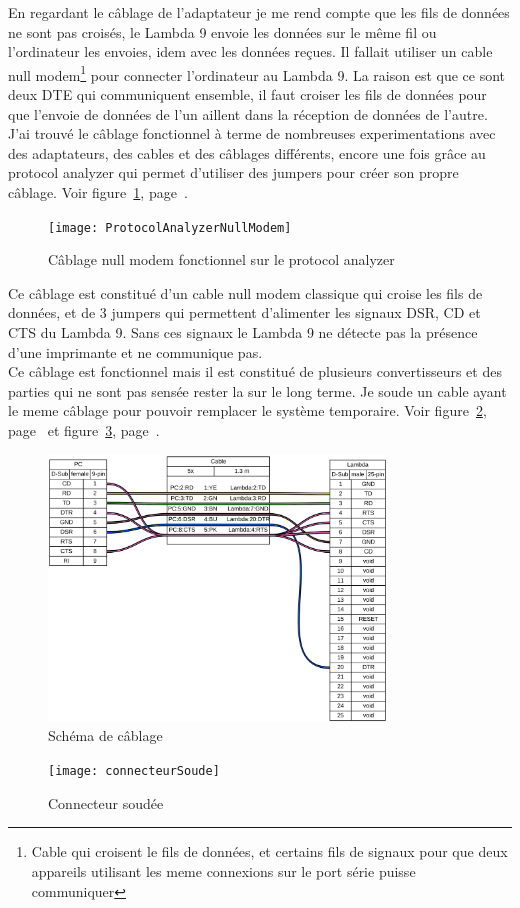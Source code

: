 \documentclass[12pt]{article}
\begin{document}
En regardant le câblage de l'adaptateur je me rend compte que les fils de données ne sont pas croisés, le Lambda 9 envoie les données sur le même fil ou l'ordinateur les envoies, idem avec les données reçues.
Il fallait utiliser un cable null modem\footnote{Cable qui croisent le fils de données, et certains fils de signaux pour que deux appareils utilisant les meme connexions sur le port série puisse communiquer} pour connecter l'ordinateur au Lambda 9.
La raison est que ce sont deux DTE qui communiquent ensemble, il faut croiser les fils de données pour que l'envoie de données de l'un aillent dans la réception de données de l'autre.\\
J'ai trouvé le câblage fonctionnel à terme de nombreuses experimentations avec des adaptateurs, des cables et des câblages différents, encore une fois grâce au protocol analyzer qui permet d'utiliser des jumpers pour créer son propre câblage.
Voir figure~\ref{fig:cablageProtocolAnalyzer}, page~\pageref{fig:cablageProtocolAnalyzer}.
\begin{figure}[h]
	\centering
	\texttt{[image: ProtocolAnalyzerNullModem]}
	\caption{Câblage null modem fonctionnel sur le protocol analyzer}
	\label{fig:cablageProtocolAnalyzer}
\end{figure}
Ce câblage est constitué d'un cable null modem classique qui croise les fils de données, et de 3 jumpers qui permettent d'alimenter les signaux DSR, CD et CTS du Lambda 9.
Sans ces signaux le Lambda 9 ne détecte pas la présence d'une imprimante et ne communique pas.\\
Ce câblage est fonctionnel mais il est constitué de plusieurs convertisseurs et des parties qui ne sont pas sensée rester la sur le long terme.
Je soude un cable ayant le meme câblage pour pouvoir remplacer le système temporaire.
Voir figure~\ref{fig:schemaCable}, page~\pageref{fig:schemaCable} et figure~\ref{fig:connecteurSoudee}, page~\pageref{fig:connecteurSoudee}.
\begin{figure}[htb]
	\centering
	\includegraphics[width=0.8\textwidth]{cableLambda}
	\caption{Schéma de câblage}
	\label{fig:schemaCable}
\end{figure}
\begin{figure}[H]
	\centering
	\texttt{[image: connecteurSoude]}
	\caption{Connecteur soudée}
	\label{fig:connecteurSoudee}
\end{figure}
\end{document}
